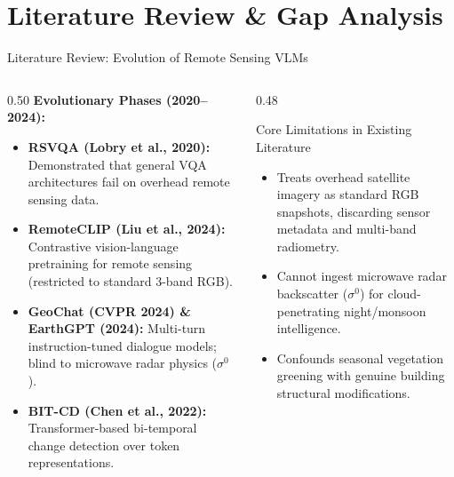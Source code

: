 \documentclass[aspectratio=169, 10pt]{beamer}
\begin{document}
\section{Literature Review \& Gap Analysis}

\begin{frame}{Literature Review: Evolution of Remote Sensing VLMs}
  \vspace{-0.2em}
  \begin{columns}[T]
    \begin{column}{0.50\textwidth}
      \textbf{\color{IEEEDarkBlue}Evolutionary Phases (2020--2024):}
      \begin{itemize}\setlength{\itemsep}{2.5pt}\small
        \item \textbf{RSVQA (Lobry et al., 2020):} Demonstrated that general VQA architectures fail on overhead remote sensing data.
        \item \textbf{RemoteCLIP (Liu et al., 2024):} Contrastive vision-language pretraining for remote sensing (restricted to standard 3-band RGB).
        \item \textbf{GeoChat (CVPR 2024) \& EarthGPT (2024):} Multi-turn instruction-tuned dialogue models; blind to microwave radar physics ($\sigma^0$).
        \item \textbf{BIT-CD (Chen et al., 2022):} Transformer-based bi-temporal change detection over token representations.
      \end{itemize}
    \end{column}

    \begin{column}{0.48\textwidth}
      \begin{alertblock}{\small Core Limitations in Existing Literature}
        \small
        \begin{itemize}\setlength{\itemsep}{2pt}
          \item Treats overhead satellite imagery as standard RGB snapshots, discarding sensor metadata and multi-band radiometry.
          \item Cannot ingest microwave radar backscatter ($\sigma^0$) for cloud-penetrating night/monsoon intelligence.
          \item Confounds seasonal vegetation greening with genuine building structural modifications.
        \end{itemize}
      \end{alertblock}
    \end{column}
  \end{columns}
\end{frame}
\end{document}
